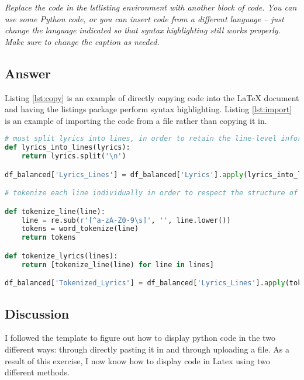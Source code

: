 \documentclass[12pt]{article}
\begin{document}
\emph{Replace the code in the lstlisting environment with another block of code. You can use some Python code, or you can insert code from a different language -- just change the language indicated so that syntax highlighting still works properly. Make sure to change the caption as needed.}

\subsection*{Answer}

Listing \ref{lst:copy} is an example of directly copying code into the LaTeX document and having the listings package perform syntax highlighting. Listing \ref{lst:import} is an example of importing the code from a file rather than copying it in.

\begin{lstlisting}[language=Python, caption=Tokenization of song lyrics copied into the LaTeX, label=lst:copy]
# must split lyrics into lines, in order to retain the line-level information.
def lyrics_into_lines(lyrics):
    return lyrics.split('\n')

df_balanced['Lyrics_Lines'] = df_balanced['Lyrics'].apply(lyrics_into_lines)

# tokenize each line individually in order to respect the structure of the song.

def tokenize_line(line):
    line = re.sub(r'[^a-zA-Z0-9\s]', '', line.lower())
    tokens = word_tokenize(line)
    return tokens

def tokenize_lyrics(lines):
    return [tokenize_line(line) for line in lines]

df_balanced['Tokenized_Lyrics'] = df_balanced['Lyrics_Lines'].apply(tokenize_lyrics)
\end{lstlisting}



\subsection*{Discussion}

I followed the template to figure out how to display python code in the two different ways: through directly pasting it in and through uploading a file. As a result of this exercise, I now know how to display code in Latex using two different methods.
\end{document}
